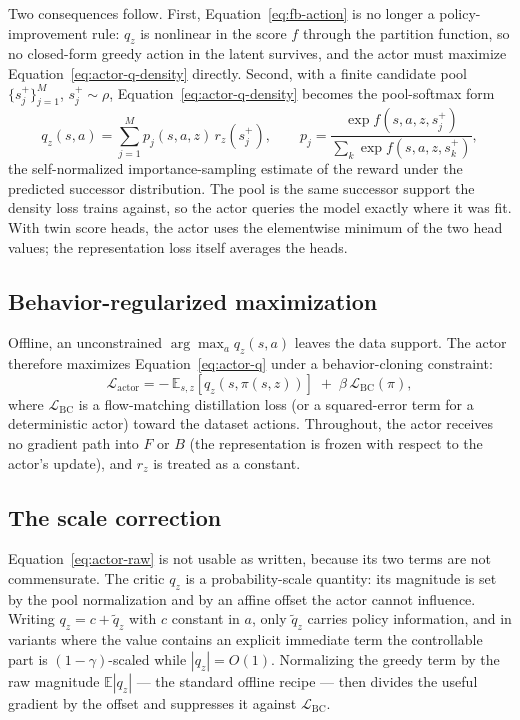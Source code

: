\documentclass[11pt]{article}
\begin{document}
{\color{addgreen}
Two consequences follow.
First, Equation~\eqref{eq:fb-action} is no longer a policy-improvement rule: $q_z$ is nonlinear in the score $f$ through the partition function, so no closed-form greedy action in the latent survives, and the actor must maximize Equation~\eqref{eq:actor-q-density} directly.
Second, with a finite candidate pool $\{s_j^+\}_{j=1}^{M}$, $s_j^+\sim\rho$, Equation~\eqref{eq:actor-q-density} becomes the pool-softmax form
\begin{equation}
    q_z(s,a) = \sum_{j=1}^{M} p_j(s,a,z)\, r_z(s_j^+),
    \qquad
    p_j = \frac{\exp f(s,a,z,s_j^+)}{\sum_{k}\exp f(s,a,z,s_k^+)},
\label{eq:actor-q-pool}
\end{equation}
the self-normalized importance-sampling estimate of the reward under the predicted successor distribution.
The pool is the same successor support the density loss trains against, so the actor queries the model exactly where it was fit.
With twin score heads, the actor uses the elementwise minimum of the two head values; the representation loss itself averages the heads.

\subsection*{Behavior-regularized maximization}

Offline, an unconstrained $\arg\max_a q_z(s,a)$ leaves the data support.
The actor therefore maximizes Equation~\eqref{eq:actor-q} under a behavior-cloning constraint:
\begin{equation}
    \mathcal L_{\mathrm{actor}}
    =
    -\,\mathbb E_{s,z}\left[ q_z(s, \pi(s,z)) \right]
    \;+\;
    \beta\, \mathcal L_{\mathrm{BC}}(\pi),
\label{eq:actor-raw}
\end{equation}
where $\mathcal L_{\mathrm{BC}}$ is a flow-matching distillation loss (or a squared-error term for a deterministic actor) toward the dataset actions.
Throughout, the actor receives no gradient path into $F$ or $B$ (the representation is frozen with respect to the actor's update), and $r_z$ is treated as a constant.

\subsection*{The scale correction}

Equation~\eqref{eq:actor-raw} is not usable as written, because its two terms are not commensurate.
The critic $q_z$ is a probability-scale quantity: its magnitude is set by the pool normalization and by an affine offset the actor cannot influence.
Writing $q_z = c + \tilde q_z$ with $c$ constant in $a$, only $\tilde q_z$ carries policy information, and in variants where the value contains an explicit immediate term the controllable part is $(1-\gamma)$-scaled while $|q_z| = O(1)$.
Normalizing the greedy term by the raw magnitude $\mathbb E|q_z|$ --- the standard offline recipe --- then divides the useful gradient by the offset and suppresses it against $\mathcal L_{\mathrm{BC}}$.

}
\end{document}
